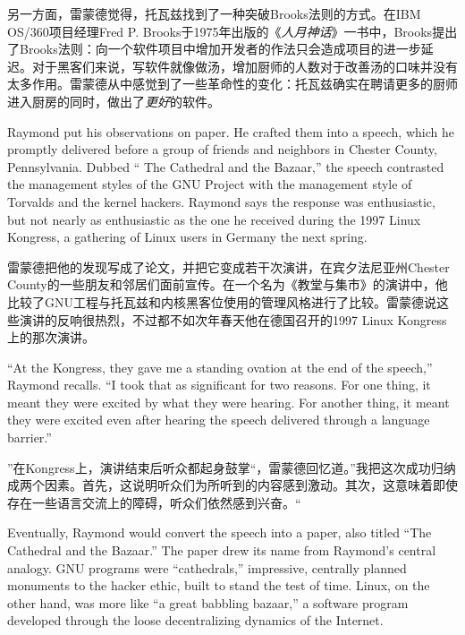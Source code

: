 \ifdefined\chs
另一方面，雷蒙德觉得，托瓦兹找到了一种突破Brooks法则的方式。在IBM OS/360项目经理Fred P. Brooks于1975年出版的《\textit{人月神话}》一书中，Brooks提出了Brooks法则：向一个软件项目中增加开发者的作法只会造成项目的进一步延迟。对于黑客们来说，写软件就像做汤，增加厨师的人数对于改善汤的口味并没有太多作用。雷蒙德从中感觉到了一些革命性的变化：托瓦兹确实在聘请更多的厨师进入厨房的同时，做出了\textit{更好}的软件。
\fi

\ifdefined\eng
Raymond put his observations on paper. He crafted them into a speech, which he promptly delivered before a group of friends and neighbors in Chester County, Pennsylvania. Dubbed `` The Cathedral and the Bazaar,'' the speech contrasted the management styles of the GNU Project with the management style of Torvalds and the kernel hackers. Raymond says the response was enthusiastic, but not nearly as enthusiastic as the one he received during the 1997 Linux Kongress, a gathering of Linux users in Germany the next spring.
\fi

\ifdefined\chs
雷蒙德把他的发现写成了论文，并把它变成若干次演讲，在宾夕法尼亚州Chester County的一些朋友和邻居们面前宣传。在一个名为《教堂与集市》的演讲中，他比较了GNU工程与托瓦兹和内核黑客位使用的管理风格进行了比较。雷蒙德说这些演讲的反响很热烈，不过都不如次年春天他在德国召开的1997 Linux Kongress上的那次演讲。
\fi

\ifdefined\eng
``At the Kongress, they gave me a standing ovation at the end of the speech,'' Raymond recalls. ``I took that as significant for two reasons. For one thing, it meant they were excited by what they were hearing. For another thing, it meant they were excited even after hearing the speech delivered through a language barrier.''
\fi

\ifdefined\chs
”在Kongress上，演讲结束后听众都起身鼓掌“，雷蒙德回忆道。”我把这次成功归纳成两个因素。首先，这说明听众们为所听到的内容感到激动。其次，这意味着即使存在一些语言交流上的障碍，听众们依然感到兴奋。“
\fi

\ifdefined\eng
Eventually, Raymond would convert the speech into a paper, also titled ``The Cathedral and the Bazaar.'' The paper drew its name from Raymond's central analogy. GNU programs were ``cathedrals,'' impressive, centrally planned monuments to the hacker ethic, built to stand the test of time. Linux, on the other hand, was more like ``a great babbling bazaar,'' a software program developed through the loose decentralizing dynamics of the Internet.
\fi

